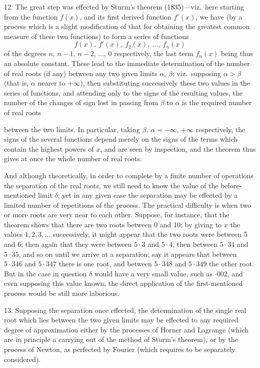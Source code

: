 \documentclass[12pt,a4paper,oneside]{book}
\begin{document}
12. The great step was effected by Sturm's theorem (1835)---viz.\ here starting from the function $f(x)$, and its first derived function $f'(x)$, we have (by a process which is a slight modification of that for obtaining the greatest common measure of these two functions) to form a series of functions
\[
f(x),\ f'(x),\ f_{2}(x),\ \dots,\ f_{n}(x)
\]
of the degrees $n$, $n-1$, $n-2$, $\dots$, $0$ respectively, the last term $f_{n}(x)$ being thus an absolute constant. These lead to the immediate determination of the number of real roots (if any) between any two given limits $\alpha$, $\beta$; viz.\ supposing $\alpha>\beta$ (that is, $\alpha$ nearer to $+\infty$), then substituting successively these two values in the series of functions, and attending only to the signs of the resulting values, the number of the changes of sign lost in passing from $\beta$ to $\alpha$ is the required number of real roots

\newpage
between the two limits. In particular, taking $\beta$, $\alpha=-\infty$, $+\infty$ respectively, the signs of the several functions depend merely on the signs of the terms which contain the highest powers of $x$, and are seen by inspection, and the theorem thus gives at once the whole number of real roots.

And although theoretically, in order to complete by a finite number of operations the separation of the real roots, we still need to know the value of the before-mentioned limit $\delta$; yet in any given case the separation may be effected by a limited number of repetitions of the process. The practical difficulty is when two or more roots are very near to each other. Suppose, for instance, that the theorem shows that there are two roots between 0 and 10; by giving to $x$ the values $1,2,3,\dots$ successively, it might appear that the two roots were between 5 and 6; then again that they were between $5\cdot 3$ and $5\cdot 4$, then between $5\cdot 34$ and $5\cdot 35$, and so on until we arrive at a separation; say it appears that between $5\cdot 346$ and $5\cdot 347$ there is one root, and between $5\cdot 348$ and $5\cdot 349$ the other root. But in the case in question $\delta$ would have a very small value, such as $\cdot 002$, and even supposing this value known, the direct application of the first-mentioned process would be still more laborious.

13. Supposing the separation once effected, the determination of the single real root which lies between the two given limits may be effected to any required degree of approximation either by the processes of Horner and Lagrange (which are in principle a carrying out of the method of Sturm's theorem), or by the process of Newton, as perfected by Fourier (which requires to be separately considered).
\end{document}
